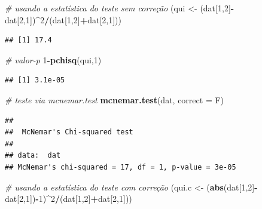 \documentclass[
]{book}
\newenvironment{Shaded}{\begin{snugshade}}{\end{snugshade}}
\newcommand{\CommentTok}[1]{\textcolor[rgb]{0.56,0.35,0.01}{\textit{#1}}}
\newcommand{\DataTypeTok}[1]{\textcolor[rgb]{0.13,0.29,0.53}{#1}}
\newcommand{\DecValTok}[1]{\textcolor[rgb]{0.00,0.00,0.81}{#1}}
\newcommand{\KeywordTok}[1]{\textcolor[rgb]{0.13,0.29,0.53}{\textbf{#1}}}
\newcommand{\NormalTok}[1]{#1}
\newcommand{\OperatorTok}[1]{\textcolor[rgb]{0.81,0.36,0.00}{\textbf{#1}}}
\newcommand{\StringTok}[1]{\textcolor[rgb]{0.31,0.60,0.02}{#1}}
\theoremstyle{definition}
\theoremstyle{definition}
\theoremstyle{definition}
\theoremstyle{remark}
\begin{document}
\begin{Shaded}
\begin{Highlighting}[]
\CommentTok{\# usando a estatística do teste sem correção}
\NormalTok{(qui \textless{}{-}}\StringTok{ }\NormalTok{(dat[}\DecValTok{1}\NormalTok{,}\DecValTok{2}\NormalTok{]}\OperatorTok{{-}}\NormalTok{dat[}\DecValTok{2}\NormalTok{,}\DecValTok{1}\NormalTok{])}\OperatorTok{\^{}}\DecValTok{2}\OperatorTok{/}\NormalTok{(dat[}\DecValTok{1}\NormalTok{,}\DecValTok{2}\NormalTok{]}\OperatorTok{+}\NormalTok{dat[}\DecValTok{2}\NormalTok{,}\DecValTok{1}\NormalTok{]))}
\end{Highlighting}
\end{Shaded}

\begin{verbatim}
## [1] 17.4
\end{verbatim}

\begin{Shaded}
\begin{Highlighting}[]
\CommentTok{\# valor{-}p}
\DecValTok{1}\OperatorTok{{-}}\KeywordTok{pchisq}\NormalTok{(qui,}\DecValTok{1}\NormalTok{)}
\end{Highlighting}
\end{Shaded}

\begin{verbatim}
## [1] 3.1e-05
\end{verbatim}

\begin{Shaded}
\begin{Highlighting}[]
\CommentTok{\# teste via mcnemar.test}
\KeywordTok{mcnemar.test}\NormalTok{(dat, }\DataTypeTok{correct =}\NormalTok{ F)}
\end{Highlighting}
\end{Shaded}

\begin{verbatim}
## 
##  McNemar's Chi-squared test
## 
## data:  dat
## McNemar's chi-squared = 17, df = 1, p-value = 3e-05
\end{verbatim}

\begin{Shaded}
\begin{Highlighting}[]
\CommentTok{\# usando a estatística do teste com correção}
\NormalTok{(qui.c \textless{}{-}}\StringTok{ }\NormalTok{(}\KeywordTok{abs}\NormalTok{(dat[}\DecValTok{1}\NormalTok{,}\DecValTok{2}\NormalTok{]}\OperatorTok{{-}}\NormalTok{dat[}\DecValTok{2}\NormalTok{,}\DecValTok{1}\NormalTok{])}\OperatorTok{{-}}\DecValTok{1}\NormalTok{)}\OperatorTok{\^{}}\DecValTok{2}\OperatorTok{/}\NormalTok{(dat[}\DecValTok{1}\NormalTok{,}\DecValTok{2}\NormalTok{]}\OperatorTok{+}\NormalTok{dat[}\DecValTok{2}\NormalTok{,}\DecValTok{1}\NormalTok{]))}
\end{Highlighting}
\end{Shaded}
\end{document}
